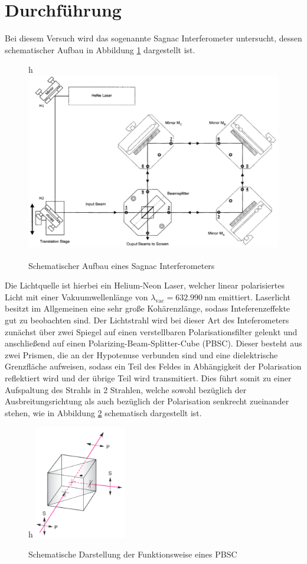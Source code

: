 \section{Durchführung}
\label{sec:Durchführung}

Bei diesem Versuch wird das sogenannte Sagnac Interferometer untersucht, dessen
schematischer Aufbau in Abbildung \ref{fig:aufbau} dargestellt ist.
\begin{figure}{h}
  \centering
  \includegraphics[width=14cm]{aufbau.png}
  \caption{Schematischer Aufbau eines Sagnac Interferometers \cite{skript}}
  \label{fig:aufbau}
\end{figure}
Die Lichtquelle ist hierbei ein Helium-Neon Laser, welcher linear polarisiertes Licht
mit einer Vakuumwellenlänge von
$\lambda_{\text{vac}}=\SI{632.990}{\nano\metre}$ emittiert.
Laserlicht besitzt im Allgemeinen eine sehr große Kohärenzlänge, sodass Inteferenzeffekte gut zu beobachten sind.
Der Lichtstrahl wird bei dieser Art des Inteferometers zunächst über zwei Spiegel auf einen
verstellbaren Polarisationsfilter gelenkt und anschließend auf einen Polarizing-Beam-Splitter-Cube (PBSC).
Dieser besteht aus zwei Prismen, die an der Hypotenuse verbunden sind und eine dielektrische Grenzfläche
aufweisen, sodass ein Teil des Feldes in Abhängigkeit der Polarisation reflektiert wird
und der übrige Teil wird transmitiert. Dies führt somit zu einer Aufspaltung des Strahls
in 2 Strahlen, welche sowohl bezüglich der Ausbreitungsrichtung als auch
bezüglich der Polarisation senkrecht zueinander stehen, wie in Abbildung \ref{fig:PBSC}
schematisch dargestellt ist.\\
\begin{figure}{h}
  \centering
  \includegraphics[width=4cm]{PBSC.png}
  \caption{Schematische Darstellung der Funktionsweise eines PBSC \cite{online1}}
  \label{fig:PBSC}
\end{figure}
